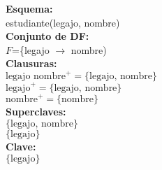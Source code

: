 \documentclass[preview]{standalone}
\begin{document}
\textbf{Esquema:}\\
estudiante(legajo, nombre)\\

\textbf{Conjunto de DF:}\\
$F$=\{legajo $\rightarrow$ nombre)\\

\textbf{Clausuras:}\\
$\text{legajo nombre}^+ =\big\{\text{legajo, nombre}\big\}$\\
$\text{legajo}^+ = \big\{\text{legajo, nombre}\big\}$\\
$\text{nombre}^+ = \big\{\text{nombre}\big\}$\\

\textbf{Superclaves: } \\
$\big\{\text{legajo, nombre}\big\}$\\ 
$\big\{\text{legajo}\big\}$\\

\textbf{Clave: }\\ 
$\big\{\text{legajo}\big\}$
\end{document}
